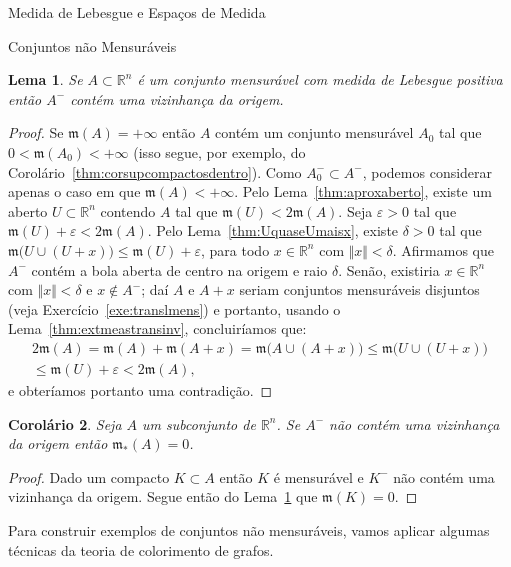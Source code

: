 \documentclass[oneside,final,11pt]{amsbook}
\newcommand{\R}{\mathds R}
\newcommand{\leb}{\mathfrak m}
\theoremstyle{remark}\newtheorem{exercise}{Exercício}[chapter]
\theoremstyle{remark}\newtheorem{*exercise}[exercise]{\hbox to 0pt{\hskip 0pt minus 1fil*}Exercício}
\theoremstyle{definition}\newtheorem{exdefin}{Definição}[chapter]
\theoremstyle{plain}\newtheorem{teo}{Teorema}[section]
\theoremstyle{plain}\newtheorem{lem}[teo]{Lema}
\theoremstyle{plain}\newtheorem{prop}[teo]{Proposição}
\theoremstyle{plain}\newtheorem{cor}[teo]{Corolário}
\theoremstyle{definition}\newtheorem{defin}[teo]{Definição}
\theoremstyle{remark}\newtheorem{rem}[teo]{Observação}
\theoremstyle{definition}\newtheorem{notation}[teo]{Notação}
\theoremstyle{definition}\newtheorem{convention}[teo]{Convenção}
\theoremstyle{definition}\newtheorem{example}[teo]{Exemplo}
\numberwithin{section}{chapter}
\numberwithin{equation}{section}
\begin{document}
\begin{chapter}{Medida de Lebesgue e Espaços de Medida}
\begin{section}{Conjuntos não Mensuráveis}
\begin{lem}\label{thm:Emenosvizorig}
Se $A\subset\R^n$ é um conjunto mensurável com medida de Lebesgue positiva então
$A^-$ contém uma vizinhança da origem.
\end{lem}
\begin{proof}
Se $\leb(A)=+\infty$ então $A$ contém um conjunto mensurável $A_0$ tal que
$0<\leb(A_0)<+\infty$ (isso segue, por exemplo, do Corolário~\ref{thm:corsupcompactosdentro}).
Como $A_0^-\subset A^-$, podemos considerar apenas o caso em que $\leb(A)<+\infty$.
Pelo Lema~\ref{thm:aproxaberto}, existe um aberto $U\subset\R^n$ contendo $A$
tal que $\leb(U)<2\leb(A)$. Seja $\varepsilon>0$ tal que $\leb(U)+\varepsilon<2\leb(A)$.
Pelo Lema~\ref{thm:UquaseUmaisx}, existe $\delta>0$ tal que $\leb\big(U\cup(U+x)\big)\le\leb(U)+\varepsilon$,
para todo $x\in\R^n$ com $\Vert x\Vert<\delta$. Afirmamos que $A^-$ contém a bola aberta
de centro na origem e raio $\delta$. Senão, existiria $x\in\R^n$ com $\Vert x\Vert<\delta$
e $x\not\in A^-$; daí $A$ e $A+x$ seriam conjuntos mensuráveis disjuntos (veja Exercício~\ref{exe:translmens})
e portanto, usando o Lema~\ref{thm:extmeastransinv}, concluiríamos que:
\begin{multline*}
2\leb(A)=\leb(A)+\leb(A+x)=\leb\big(A\cup(A+x)\big)\le\leb(U\cup(U+x)\big)\\
\le\leb(U)+\varepsilon<2\leb(A),
\end{multline*}
e obteríamos portanto uma contradição.
\end{proof}

\begin{cor}\label{thm:cormedintzero}
Seja $A$ um subconjunto de $\R^n$. Se $A^-$ não contém uma vizinhança da origem então
$\leb_*(A)=0$.
\end{cor}
\begin{proof}
Dado um compacto $K\subset A$ então $K$ é mensurável e $K^-$ não contém uma vizinhança da origem.
Segue então do Lema~\ref{thm:Emenosvizorig} que $\leb(K)=0$.
\end{proof}

Para construir exemplos de conjuntos não mensuráveis, vamos aplicar algumas técnicas da teoria de colorimento de grafos.


\end{section}
\end{chapter}
\end{document}
